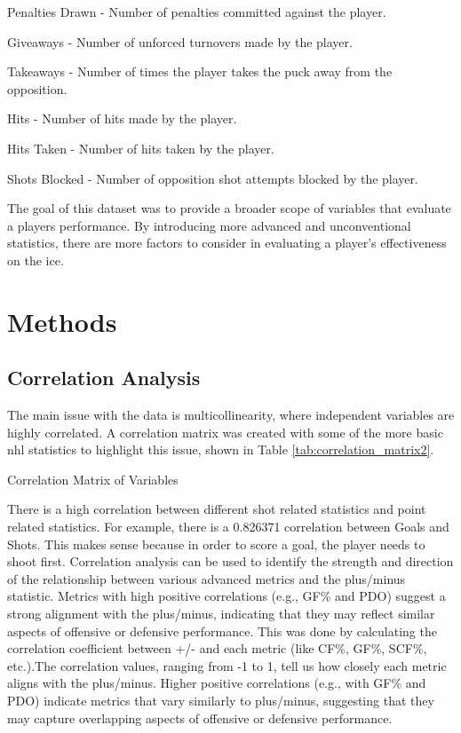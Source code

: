 \documentclass[12pt]{article}
\begin{document}
Penalties Drawn - Number of penalties committed against the player.

Giveaways - Number of unforced turnovers made by the player.

Takeaways - Number of times the player takes the puck away from the opposition.

Hits - Number of hits made by the player.

Hits Taken - Number of hits taken by the player.

Shots Blocked - Number of opposition shot attempts blocked by the player.


The goal of this dataset was to provide a broader scope of variables that evaluate a players performance. By introducing more
advanced and unconventional statistics, there are more factors to consider in evaluating a player's effectiveness on the ice.


\section{Methods}
\label{sec:meth}

\subsection{Correlation Analysis}
The main issue with the data is multicollinearity, where independent variables are highly correlated. A correlation matrix was created 
with some of the more basic nhl statistics to highlight this issue, shown in Table \ref{tab:correlation_matrix2}.

\begin{table}[h!]
  \centering
  \scriptsize
  \caption{Correlation Matrix of Variables}
  
  \label{tab:correlation_matrix2}
\end{table}


There is a high correlation between different shot related statistics and point related statistics. For example, there is a 
0.826371 correlation between Goals and Shots. This makes sense because in order to score a goal, the player needs to shoot first.
Correlation analysis can be used to identify the strength and direction of the relationship between various advanced metrics and 
the plus/minus statistic. Metrics with high positive correlations (e.g., GF\% and PDO) suggest a strong alignment with the plus/minus, 
indicating that they may reflect similar aspects of offensive or defensive performance. This was done by calculating the correlation 
coefficient between +/- and each metric (like CF\%, GF\%, SCF\%, etc.).The correlation values, ranging from -1 to 1, tell us how closely 
each metric aligns with the plus/minus. Higher positive correlations (e.g., with GF\% and PDO) indicate metrics that vary similarly to 
plus/minus, suggesting that they may capture overlapping aspects of offensive or defensive performance.
\end{document}
